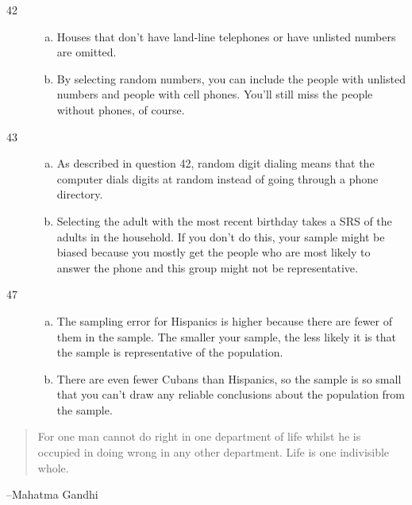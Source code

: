 \documentclass[letterpaper, landscape]{exam}
\begin{document}
\begin{description}
      \item[42]
        \begin{enumerate}[(a)]
          \item Houses that don't have land-line telephones or have unlisted
          numbers are omitted.

          \item By selecting random numbers, you can include the people with
          unlisted numbers and people with cell phones.  You'll still miss the
          people without phones, of course.

        \end{enumerate}

      \item[43]
        \begin{enumerate}[(a)]
          \item As described in question 42, random digit dialing means that the
            computer dials digits at random instead of going through a phone
            directory.

          \item Selecting the adult with the most recent birthday takes a SRS of
            the adults in the household.  If you don't do this, your sample
            might be biased because you mostly get the people who are most
            likely to answer the phone and this group might not be
            representative.
        \end{enumerate}

      \item[47]
        \begin{enumerate}[(a)]
          \item The sampling error for Hispanics is higher because there are
          fewer of them in the sample.  The smaller your sample, the less likely
          it is that the sample is representative of the population.

          \item There are even fewer Cubans than Hispanics, so the sample is so
          small that you can't draw any reliable conclusions about the
          population from the sample.
        \end{enumerate}

  \end{description}

  \else
    \vspace{11 cm}
    \begin{quote}
      \begin{em}
        For one man cannot do right in one department of life whilst he is
        occupied in doing wrong in any other department. Life is one indivisible
        whole.
      \end{em}
    \end{quote}
    \hspace{1 cm} --Mahatma Gandhi
  \fi
\end{document}
